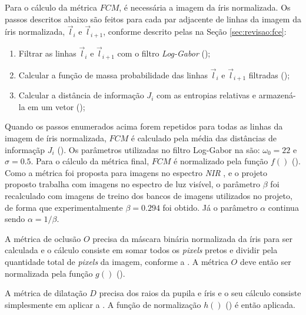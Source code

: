 \par Para o cálculo da métrica $FCM$, é necessária a imagem da íris normalizada. Os passos descritos abaixo são feitos para cada par adjacente de linhas da imagem da íris normalizada, $\vec{l}_{i}$ e $\vec{l}_{i+1}$, conforme descrito pelas  na Seção \ref{sec:revisao:fce}:

\begin{enumerate}
    \item Filtrar as linhas $\vec{l}_{i}$ e $\vec{l}_{i+1}$ com o filtro \textit{Log-Gabor} ();
    \item Calcular a função de massa probabilidade das linhas $\vec{l}_{i}$ e $\vec{l}_{i+1}$ filtradas ();
    \item Calcular a distância de informação $J_{i}$ com as entropias relativas e armazená-la em um vetor ();
\end{enumerate}

\par Quando os passos enumerados acima forem repetidos para todas as linhas da imagem de íris normalizada, $FCM$ é calculado pela média das distâncias de informaçãp $J_{i}$ (). Os parâmetros utilizadas no filtro Log-Gabor na  são: $\omega_{0} = 22$ e $\sigma = 0.5$. Para o cálculo da métrica final, $FCM$ é normalizado pela função $f()$ (). Como a métrica foi proposta para imagens no espectro \textit{NIR} \cite{du2010}, e o projeto proposto trabalha com imagens no espectro de luz visível, o parâmetro $\beta$ foi recalculado com imagens de treino dos bancos de imagens utilizados no projeto, de forma que experimentalmente $\beta = 0.294$ foi obtido. Já o parâmetro $\alpha$ continua sendo $\alpha = 1/\beta$.

\par A métrica de oclusão $O$ precisa da máscara binária normalizada da íris para ser calculada e o cálculo consiste em somar todos os \textit{pixels} pretos e dividir pela quantidade total de \textit{pixels} da imagem, conforme a . A métrica $O$ deve então ser normalizada pela função $g()$ ().

\par A métrica de dilatação $D$ precisa dos raios da pupila e íris e o seu cálculo consiste simplesmente em aplicar a . A função de normalização $h()$ () é então aplicada.


